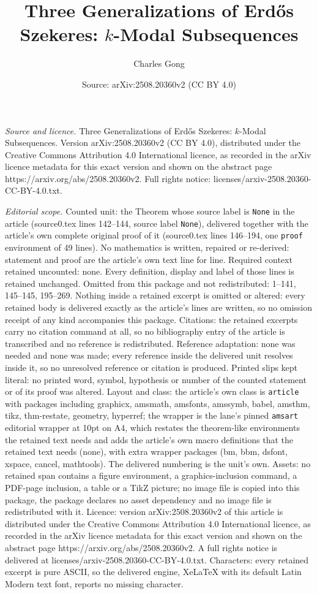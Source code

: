 \documentclass[10pt,a4paper]{amsart}
\title[Three Generalizations of Erd\H{o}s Szekeres: $k$-Modal Subse]{Three Generalizations of Erd\H{o}s Szekeres: $k$-Modal Subsequences}
\author{Charles Gong}
\date{Source: arXiv:2508.20360v2 (CC BY 4.0)}
\begin{document}
\maketitle

\noindent\emph{Source and licence.} Three Generalizations of Erd\H{o}s Szekeres: $k$-Modal Subsequences. Version arXiv:2508.20360v2 (CC BY 4.0), distributed under the Creative Commons Attribution 4.0 International licence, as recorded in the arXiv licence metadata for this exact version and shown on the abstract page https://arxiv.org/abs/2508.20360v2. Full rights notice: licenses/arxiv-2508.20360-CC-BY-4.0.txt.\par\smallskip

\noindent\textit{Editorial scope.} Counted unit: the Theorem whose source label is \texttt{None} in the article (source0.tex lines 142--144, source label \texttt{None}), delivered together with the article's own complete original proof of it (source0.tex lines 146--194, one \texttt{proof} environment of 49 lines). No mathematics is written, repaired or re-derived: statement and proof are the article's own text line for line. Required context retained uncounted: none. Every definition, display and label of those lines is retained unchanged. Omitted from this package and not redistributed: 1--141, 145--145, 195--269. Nothing inside a retained excerpt is omitted or altered: every retained body is delivered exactly as the article's lines are written, so no omission receipt of any kind accompanies this package. Citations: the retained excerpts carry no citation command at all, so no bibliography entry of the article is transcribed and no reference is redistributed. Reference adaptation: none was needed and none was made; every reference inside the delivered unit resolves inside it, so no unresolved reference or citation is produced. Printed slips kept literal: no printed word, symbol, hypothesis or number of the counted statement or of its proof was altered. Layout and class: the article's own class is \texttt{article} with packages including graphicx, amsmath, amsfonts, amssymb, babel, amsthm, tikz, thm-restate, geometry, hyperref; the wrapper is the lane's pinned \texttt{amsart} editorial wrapper at 10pt on A4, which restates the theorem-like environments the retained text needs and adds the article's own macro definitions that the retained text needs (none), with extra wrapper packages (bm, bbm, dsfont, xspace, cancel, mathtools). The delivered numbering is the unit's own. Assets: no retained span contains a figure environment, a graphics-inclusion command, a PDF-page inclusion, a table or a TikZ picture; no image file is copied into this package, the package declares no asset dependency and no image file is redistributed with it. Licence: version arXiv:2508.20360v2 of this article is distributed under the Creative Commons Attribution 4.0 International licence, as recorded in the arXiv licence metadata for this exact version and shown on the abstract page https://arxiv.org/abs/2508.20360v2. A full rights notice is delivered at licenses/arxiv-2508.20360-CC-BY-4.0.txt. Characters: every retained excerpt is pure ASCII, so the delivered engine, XeLaTeX with its default Latin Modern text font, reports no missing character.
\end{document}
